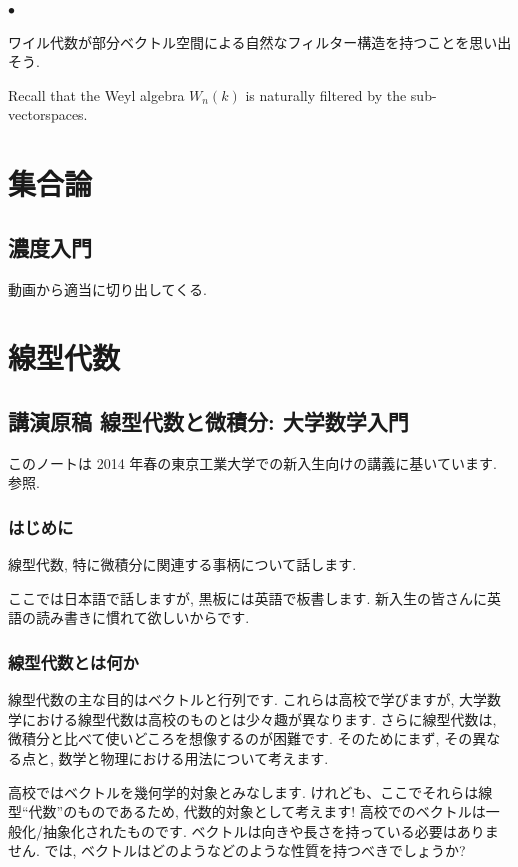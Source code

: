 \documentclass[openany, a4paper, oneside]{jsbook}
\newcounter{enum2}
\renewenvironment{itemize}{%
\begin{list}{$\bullet$\ \ }%
{%
\usecounter{enum2}
\setlength{\itemindent}{0pt}%
\setlength{\leftmargin}{15pt}%
\setlength{\rightmargin}{0pt}%
\setlength{\labelsep}{0pt}%
\setlength{\labelwidth}{6pt}%
\setlength{\itemsep}{0pt}%
\setlength{\parsep}{0pt}%
\setlength{\listparindent}{0pt}%
}
}{%
\end{list}%
}
\theoremstyle{break}
\theoremstyle{breakdefn}
\begin{document}
\begin{itemize}
\item ワイル代数が部分ベクトル空間による自然なフィルター構造を持つことを思い出そう.
\end{itemize}
Recall that the Weyl algebra $W_n(k)$ is naturally filtered by the sub-vectorspaces.
\part{集合論}

\chapter{濃度入門}


動画から適当に切り出してくる.
\part{線型代数}

\chapter{講演原稿 線型代数と微積分: 大学数学入門}


このノートは 2014 年春の東京工業大学での新入生向けの講義に基いています.
\cite{MasahikoSaitoh1, AsaoArai3, AraiEzawa1, AraiEzawa2, KenjiFukaya2, ToshioNiwa1} 参照.
\section{はじめに}


線型代数, 特に微積分に関連する事柄について話します.

ここでは日本語で話しますが, 黒板には英語で板書します.
新入生の皆さんに英語の読み書きに慣れて欲しいからです.
\section{線型代数とは何か}


線型代数の主な目的はベクトルと行列です.
これらは高校で学びますが,
大学数学における線型代数は高校のものとは少々趣が異なります.
さらに線型代数は, 微積分と比べて使いどころを想像するのが困難です.
そのためにまず, その異なる点と, 数学と物理における用法について考えます.

高校ではベクトルを幾何学的対象とみなします.
けれども、ここでそれらは線型``代数''のものであるため,
代数的対象として考えます!
高校でのベクトルは一般化/抽象化されたものです.
ベクトルは向きや長さを持っている必要はありません.
では, ベクトルはどのようなどのような性質を持つべきでしょうか?
\end{document}
